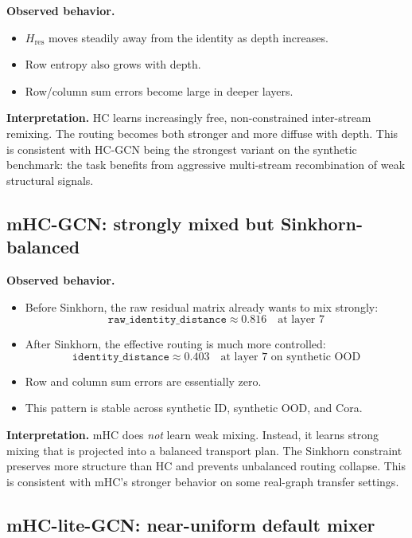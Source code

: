 \documentclass[11pt,a4paper]{article}
\begin{document}
\textbf{Observed behavior.}
\begin{itemize}[noitemsep]
  \item $H_{\mathrm{res}}$ moves steadily away from the identity as depth increases.
  \item Row entropy also grows with depth.
  \item Row/column sum errors become large in deeper layers.
\end{itemize}

\textbf{Interpretation.}
HC learns increasingly free, non-constrained inter-stream remixing.
The routing becomes both stronger and more diffuse with depth.
This is consistent with HC-GCN being the strongest variant on the synthetic benchmark:
the task benefits from aggressive multi-stream recombination of weak structural signals.

\subsection{mHC-GCN: strongly mixed but Sinkhorn-balanced}

\textbf{Observed behavior.}
\begin{itemize}[noitemsep]
  \item Before Sinkhorn, the raw residual matrix already wants to mix strongly:
  \[
  \texttt{raw\_identity\_distance} \approx 0.816 \quad \text{at layer 7}
  \]
  \item After Sinkhorn, the effective routing is much more controlled:
  \[
  \texttt{identity\_distance} \approx 0.403 \quad \text{at layer 7 on synthetic OOD}
  \]
  \item Row and column sum errors are essentially zero.
  \item This pattern is stable across synthetic ID, synthetic OOD, and Cora.
\end{itemize}

\textbf{Interpretation.}
mHC does \emph{not} learn weak mixing.
Instead, it learns strong mixing that is projected into a balanced transport plan.
The Sinkhorn constraint preserves more structure than HC and prevents unbalanced routing collapse.
This is consistent with mHC's stronger behavior on some real-graph transfer settings.

\subsection{mHC-lite-GCN: near-uniform default mixer}
\end{document}
